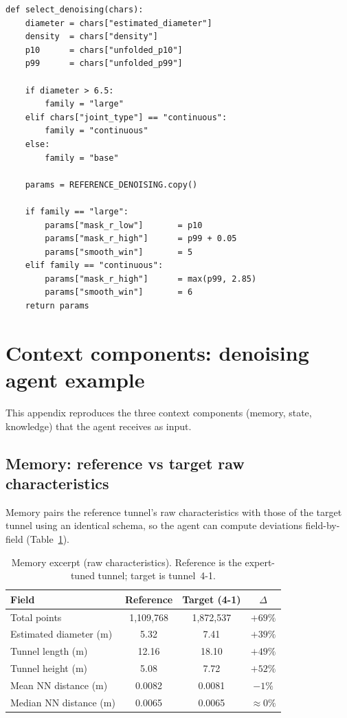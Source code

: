 \begin{verbatim}
def select_denoising(chars):
    diameter = chars["estimated_diameter"]
    density  = chars["density"]
    p10      = chars["unfolded_p10"]
    p99      = chars["unfolded_p99"]

    if diameter > 6.5:
        family = "large"          
    elif chars["joint_type"] == "continuous":
        family = "continuous"     
    else:
        family = "base"           

    params = REFERENCE_DENOISING.copy()

    if family == "large":
        params["mask_r_low"]       = p10
        params["mask_r_high"]      = p99 + 0.05
        params["smooth_win"]       = 5
    elif family == "continuous":
        params["mask_r_high"]      = max(p99, 2.85)
        params["smooth_win"]       = 6
    return params
\end{verbatim}

\section{Context components: denoising agent example}\label{app:context}

This appendix reproduces the three context components (memory, state, knowledge) that the agent receives as input.

\subsection{Memory: reference vs target raw characteristics}\label{app:context-memory}
Memory pairs the reference tunnel's raw characteristics with those of the target tunnel using an identical schema, so the agent can compute deviations field-by-field (Table~\ref{tab:context-memory}).

\begin{table}[ht]
\caption{Memory excerpt (raw characteristics). Reference is the expert-tuned tunnel; target is tunnel~4-1.}\label{tab:context-memory}
\begin{tabular*}{\tblwidth}{@{} l c c c @{}}
\toprule
Field & Reference & Target (4-1) & $\Delta$ \\
\midrule
Total points & 1{,}109{,}768 & 1{,}872{,}537 & $+69\%$ \\
Estimated diameter (m) & 5.32 & 7.41 & $+39\%$ \\
Tunnel length (m) & 12.16 & 18.10 & $+49\%$ \\
Tunnel height (m) & 5.08 & 7.72 & $+52\%$ \\
Mean NN distance (m) & 0.0082 & 0.0081 & $-1\%$ \\
Median NN distance (m) & 0.0065 & 0.0065 & $\approx 0\%$ \\
\bottomrule
\end{tabular*}
\end{table}


